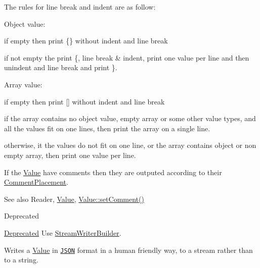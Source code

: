 The rules for line break and indent are as follow\+:
\begin{DoxyItemize}
\item Object value\+:
\begin{DoxyItemize}
\item if empty then print \{\} without indent and line break
\item if not empty the print \textquotesingle{}\{\textquotesingle{}, line break \& indent, print one value per line and then unindent and line break and print \textquotesingle{}\}\textquotesingle{}.
\end{DoxyItemize}
\item Array value\+:
\begin{DoxyItemize}
\item if empty then print \mbox{[}\mbox{]} without indent and line break
\item if the array contains no object value, empty array or some other value types, and all the values fit on one lines, then print the array on a single line.
\item otherwise, it the values do not fit on one line, or the array contains object or non empty array, then print one value per line.
\end{DoxyItemize}
\end{DoxyItemize}

If the \hyperlink{classJson_1_1Value}{Value} have comments then they are outputed according to their \hyperlink{namespaceJson_a4fc417c23905b2ae9e2c47d197a45351}{Comment\+Placement}.

\begin{DoxySeeAlso}{See also}
Reader, \hyperlink{classJson_1_1Value}{Value}, \hyperlink{classJson_1_1Value_a29f3a30f7e5d3af6f38d57999bf5b480}{Value\+::set\+Comment()} 
\end{DoxySeeAlso}
\begin{DoxyRefDesc}{Deprecated}
\item[\hyperlink{deprecated__deprecated000009}{Deprecated}]Use \hyperlink{classJson_1_1StreamWriterBuilder}{Stream\+Writer\+Builder}. \end{DoxyRefDesc}
Writes a \hyperlink{classJson_1_1Value}{Value} in \href{http://www.json.org}{\tt J\+S\+ON} format in a human friendly way, to a stream rather than to a string.

